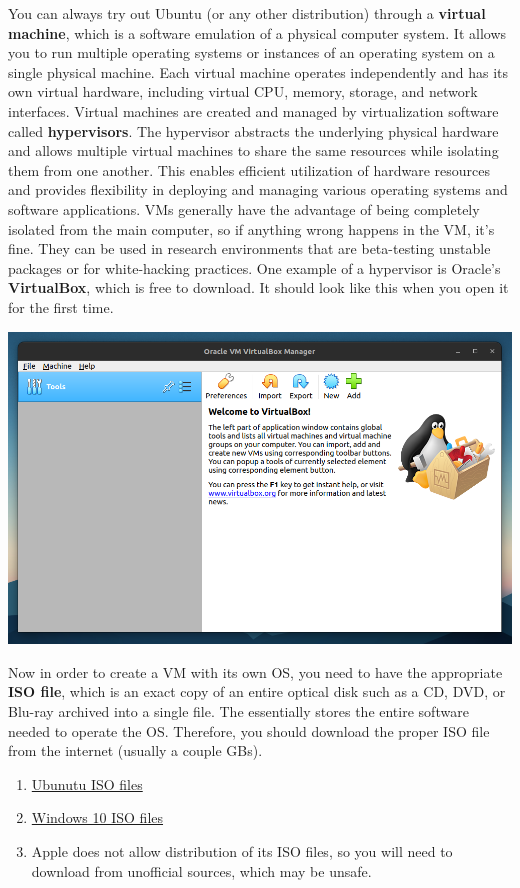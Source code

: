 \documentclass{article}
\begin{document}
  You can always try out Ubuntu (or any other distribution) through a \textbf{virtual machine}, which is a software emulation of a physical computer system. It allows you to run multiple operating systems or instances of an operating system on a single physical machine. Each virtual machine operates independently and has its own virtual hardware, including virtual CPU, memory, storage, and network interfaces. Virtual machines are created and managed by virtualization software called \textbf{hypervisors}. The hypervisor abstracts the underlying physical hardware and allows multiple virtual machines to share the same resources while isolating them from one another. This enables efficient utilization of hardware resources and provides flexibility in deploying and managing various operating systems and software applications. VMs generally have the advantage of being completely isolated from the main computer, so if anything wrong happens in the VM, it's fine. They can be used in research environments that are beta-testing unstable packages or for white-hacking practices. One example of a hypervisor is Oracle's \textbf{VirtualBox}, which is free to download. It should look like this when you open it for the first time. 
  \begin{center}
      \includegraphics[scale=0.2]{img/VirtualBox.png}
  \end{center}
  Now in order to create a VM with its own OS, you need to have the appropriate \textbf{ISO file}, which is an exact copy of an entire optical disk such as a CD, DVD, or Blu-ray archived into a single file. The essentially stores the entire software needed to operate the OS. Therefore, you should download the proper ISO file from the internet (usually a couple GBs). 
  \begin{enumerate}
      \item \href{https://ubuntu.com/download/desktop}{Ubunutu ISO files}
      \item \href{https://www.microsoft.com/en-us/software-download/windows10}{Windows 10 ISO files}
      \item Apple does not allow distribution of its ISO files, so you will need to download from unofficial sources, which may be unsafe. 
  \end{enumerate}
\end{document}
